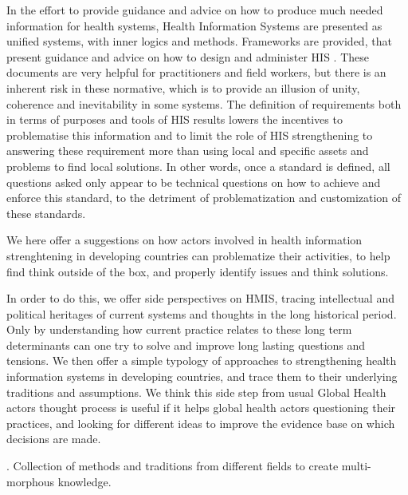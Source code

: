 In the effort to provide guidance and advice on how to produce much needed information for health systems, Health Information Systems are presented as unified systems, with inner logics and methods. Frameworks are provided, that present guidance and advice on how to design and administer HIS \cite{health_metrics_network_framework_2008}. These documents are very helpful for practitioners and field workers, but there is an inherent risk in these normative, which is to provide an illusion of unity, coherence and inevitability in some systems. The definition of requirements both in terms of purposes and tools of HIS results lowers the incentives to problematise this information and to limit the role of HIS strengthening to answering these requirement more than using local and specific assets and problems to find local solutions. In other words, once a standard is defined, all questions asked only appear to be technical questions on how to achieve and enforce this standard, to the detriment of problematization and customization of these standards.%

We here offer a suggestions on how actors involved in health information strenghtening in developing countries can problematize their activities, to help find think outside of the box, and properly identify issues and think solutions.

In order to do this, we offer side perspectives on HMIS, tracing intellectual and political heritages of current systems and thoughts in the long historical period. Only by understanding how current practice relates to these long term determinants can one try to solve and improve long lasting questions and tensions. We  then offer a simple typology of approaches to strengthening health information systems in developing countries, and trace them to their underlying traditions and assumptions. We think this side step from usual Global Health actors thought process is useful if it helps global health actors questioning their practices, and looking for different ideas to improve the evidence base on which decisions are made.

\cite{vital_wave_consulting_health_2009}. Collection of methods and traditions from different fields to create multi-morphous knowledge. %




